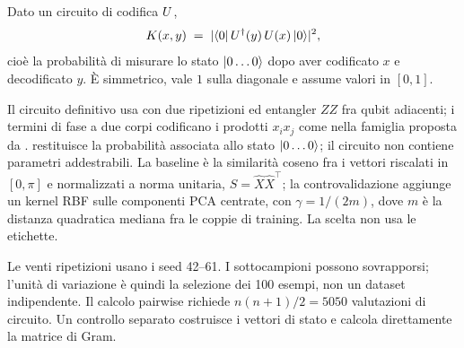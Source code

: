 \begin{definizione}
Dato un circuito di codifica $U$,
\begin{equation}
  K(x,y) \;=\; \lvert \bra{0}U^{\dagger}(y)\,U(x)\ket{0} \rvert^2 ,
  \label{eq:fidelity-kernel}
\end{equation}
cioè la probabilità di misurare lo stato $\ket{0\ldots0}$ dopo aver codificato $x$
e decodificato $y$. È simmetrico, vale $1$ sulla diagonale e assume valori in
$[0,1]$.
\end{definizione}

Il circuito definitivo usa  con due ripetizioni ed
entangler $ZZ$ fra qubit adiacenti; i termini di fase a due corpi codificano i
prodotti $x_i x_j$ come nella famiglia proposta da
\textcite{havlicek2019supervised}.  restituisce la probabilità
associata allo stato $\ket{0\ldots0}$; il circuito non contiene parametri
addestrabili. La baseline è la similarità coseno fra i vettori riscalati in
$[0,\pi]$ e
normalizzati a norma unitaria, $S = \hat{X}\hat{X}^{\top}$; la controvalidazione
aggiunge un kernel RBF sulle componenti PCA centrate, con $\gamma=1/(2m)$, dove
$m$ è la distanza quadratica mediana fra le coppie di training. La scelta non usa
le etichette.

Le venti ripetizioni usano i seed 42--61. I sottocampioni possono sovrapporsi;
l'unità di variazione è quindi la selezione dei 100 esempi, non un dataset
indipendente. Il calcolo pairwise richiede
$n(n+1)/2=\num{5050}$ valutazioni di circuito. Un controllo separato costruisce i
vettori di stato e calcola direttamente la matrice di Gram.
